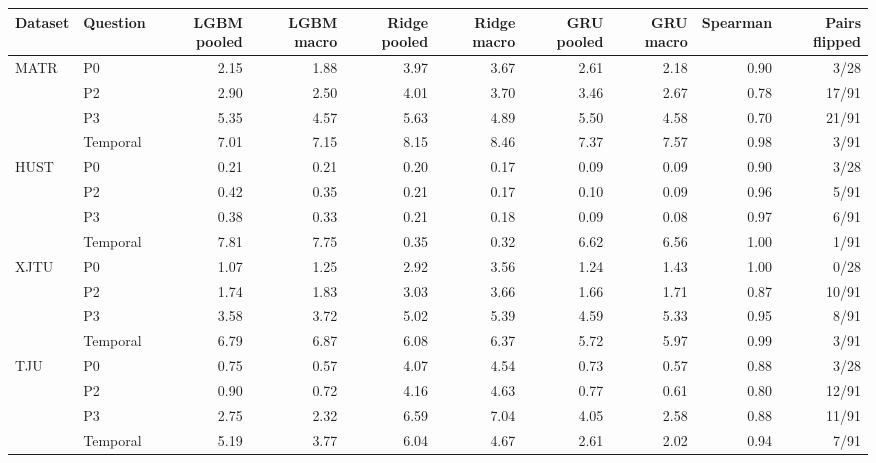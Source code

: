 \begin{tabular}{llrrrrrrrr}
\toprule
Dataset & Question & LGBM pooled & LGBM macro & Ridge pooled & Ridge macro & GRU pooled & GRU macro & Spearman & Pairs flipped \\
\midrule
MATR & P0 & 2.15 & 1.88 & 3.97 & 3.67 & 2.61 & 2.18 & 0.90 & 3/28 \\
 & P2 & 2.90 & 2.50 & 4.01 & 3.70 & 3.46 & 2.67 & 0.78 & 17/91 \\
 & P3 & 5.35 & 4.57 & 5.63 & 4.89 & 5.50 & 4.58 & 0.70 & 21/91 \\
 & Temporal & 7.01 & 7.15 & 8.15 & 8.46 & 7.37 & 7.57 & 0.98 & 3/91 \\
HUST & P0 & 0.21 & 0.21 & 0.20 & 0.17 & 0.09 & 0.09 & 0.90 & 3/28 \\
 & P2 & 0.42 & 0.35 & 0.21 & 0.17 & 0.10 & 0.09 & 0.96 & 5/91 \\
 & P3 & 0.38 & 0.33 & 0.21 & 0.18 & 0.09 & 0.08 & 0.97 & 6/91 \\
 & Temporal & 7.81 & 7.75 & 0.35 & 0.32 & 6.62 & 6.56 & 1.00 & 1/91 \\
XJTU & P0 & 1.07 & 1.25 & 2.92 & 3.56 & 1.24 & 1.43 & 1.00 & 0/28 \\
 & P2 & 1.74 & 1.83 & 3.03 & 3.66 & 1.66 & 1.71 & 0.87 & 10/91 \\
 & P3 & 3.58 & 3.72 & 5.02 & 5.39 & 4.59 & 5.33 & 0.95 & 8/91 \\
 & Temporal & 6.79 & 6.87 & 6.08 & 6.37 & 5.72 & 5.97 & 0.99 & 3/91 \\
TJU & P0 & 0.75 & 0.57 & 4.07 & 4.54 & 0.73 & 0.57 & 0.88 & 3/28 \\
 & P2 & 0.90 & 0.72 & 4.16 & 4.63 & 0.77 & 0.61 & 0.80 & 12/91 \\
 & P3 & 2.75 & 2.32 & 6.59 & 7.04 & 4.05 & 2.58 & 0.88 & 11/91 \\
 & Temporal & 5.19 & 3.77 & 6.04 & 4.67 & 2.61 & 2.02 & 0.94 & 7/91 \\
\bottomrule
\end{tabular}
